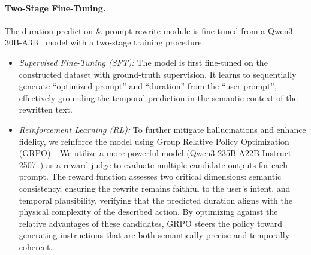 \paragraph{Two-Stage Fine-Tuning.}
The duration prediction \& prompt rewrite module is fine-tuned from a Qwen3-30B-A3B~\citep{Yang2025} model with a two-stage training procedure.
\begin{itemize}
    \item \textit{Supervised Fine-Tuning (SFT):}
    The model is first fine-tuned on the constructed dataset with ground-truth supervision.
    It learns to sequentially generate ``optimized prompt'' and ``duration'' from the ``user prompt'', effectively grounding the temporal prediction in the semantic context of the rewritten text.

    \item \textit{Reinforcement Learning (RL):}
    To further mitigate hallucinations and enhance fidelity, we reinforce the model using Group Relative Policy Optimization (GRPO)~\citep{Shao2024}.
    We utilize a more powerful model (Qwen3-235B-A22B-Instruct-2507~\citep{Yang2025}) as a reward judge to evaluate multiple candidate outputs for each prompt.
    The reward function assesses two critical dimensions: semantic consistency, ensuring the rewrite remains faithful to the user's intent, and temporal plausibility, verifying that the predicted duration aligns with the physical complexity of the described action.
    By optimizing against the relative advantages of these candidates, GRPO steers the policy toward generating instructions that are both semantically precise and temporally coherent.
\end{itemize}





